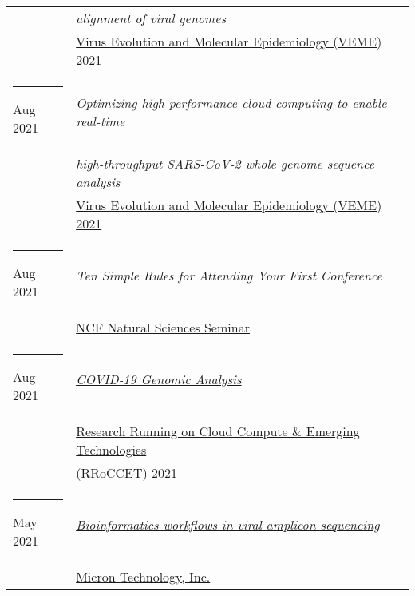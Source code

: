 \documentclass[margin,line]{res}
\begin{document}
\begin{resume}
\begin{longtable}{@{}p{0.7in}p{4in}}
\hspace*{-4mm} & \hspace{4mm} \textit{alignment of viral genomes}\\*
\hspace*{-4mm} & \hspace{4mm} \href{https://rega.kuleuven.be/cev/veme-workshop/2021}{Virus Evolution and Molecular Epidemiology (VEME) 2021}\\
\hspace*{-4mm} \rule{-1mm}{5mm} Aug 2021 & \textit{Optimizing high-performance cloud computing to enable real-time}\\*
\hspace*{-4mm} & \hspace{4mm} \textit{high-throughput SARS-CoV-2 whole genome sequence analysis}\\*
\hspace*{-4mm} & \hspace{4mm} \href{https://rega.kuleuven.be/cev/veme-workshop/2021}{Virus Evolution and Molecular Epidemiology (VEME) 2021}\\
\hspace*{-4mm} \rule{-1mm}{5mm} Aug 2021 & \textit{Ten Simple Rules for Attending Your First Conference}\\*
\hspace*{-4mm} & \hspace{4mm} \href{https://www.ncf.edu/academics/undergraduate-program/division-of-natural-sciences/natural-sciences/}{NCF Natural Sciences Seminar}\\
\hspace*{-4mm} \rule{-1mm}{5mm} Aug 2021 & \href{https://na.eventscloud.com/website/23042/}{\textit{COVID-19 Genomic Analysis}}\\*
\hspace*{-4mm} & \hspace{4mm} \href{https://na.eventscloud.com/website/23042/}{Research Running on Cloud Compute \& Emerging Technologies}\\*
\hspace*{-4mm} & \hspace{4mm} \href{https://na.eventscloud.com/website/23042/}{(RRoCCET) 2021}\\
\hspace*{-4mm} \rule{-1mm}{5mm} May 2021 & \href{https://www.micron.com/}{\textit{Bioinformatics workflows in viral amplicon sequencing}}\\*
\hspace*{-4mm} & \hspace{4mm} \href{https://www.micron.com/}{Micron Technology, Inc.}\\

\end{longtable}
\end{resume}
\end{document}
